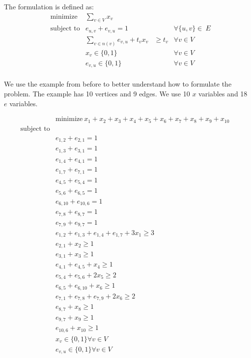 The formulation is defined as:
\begin{equation*}
	\begin{aligned}
	& {\text{minimize}}&\sum_{v\in V}{x_{v}}\\ 
	&\text{subject to} & e_{u,v}+e_{v,u}=1  &&\forall\{u,v\}\in\ E \\
	& & \sum_{v\in n(v)} e_{v,u} + t_{v} x_{v}& \geq t_{v} & \forall v \in V\\
	& &x_{v} \in \{0,1\}  & & \forall v \in V\\
	& &e_{v,u}\in \{0,1\}  & & \forall v \in V\\
	\end{aligned}
\end{equation*}

We use the example from before to better understand how to formulate the problem. The example has 10 vertices and 9 edges. We use 10 $x$ variables and 18 $e$ variables. 

\begin{equation*}
	\begin{aligned}
	&&& {\text{minimize}} \ x_{1}+x_{2}+x_{3}+x_{4}+x_{5}+x_{6}+x_{7}+x_{8}+x_{9}+x_{10}&&&\\ 
	&&\text{subject to} &&& \\
	&&&e_{1,2}+e_{2,1}=1&&\\
	&&&e_{1,3}+e_{3,1}=1&&\\
	&&&e_{1,4}+e_{4,1}=1&&\\
	&&&e_{1,7}+e_{7,1}=1&&\\
	&&&e_{4,5}+e_{5,4}=1&&\\
	&&&e_{5,6}+e_{6,5}=1&&\\
	&&&e_{6,10}+e_{10,6}=1&&\\
	&&&e_{7,8}+e_{8,7}=1&&\\
	&&&e_{7,9}+e_{9,7}=1&&\\	
	&&& e_{1,2}+e_{1,3}+e_{1,4}+e_{1,7}+3x_{1}\geq 3&&\\
	&&& e_{2,1} + x_{2}\geq 1&&\\
	&&& e_{3,1} + x_{3}\geq 1&&\\
	&&& e_{4,1} + e_{4,5} + x_{4}\geq 1&&\\
	&&& e_{5,4} + e_{5,6} + 2 x_{5}\geq 2&&\\
	&&& e_{6,5} + e_{6,10} + x_{6}\geq 1&&\\
	&&& e_{7,1} + e_{7,8} + e_{7,9} + 2 x_{6}\geq 2&&\\
	&&& e_{8,7} + x_{8}\geq 1&&\\
	&&& e_{9,7} + x_{9}\geq 1&&\\
	&&& e_{10,6} + x_{10}\geq 1&&\\
	&&&x_{v} \in \{0,1\}  \forall v \in V&&\\
	&&&e_{v,u}\in \{0,1\}  \forall v \in V &&\\
	\end{aligned}
\end{equation*}

